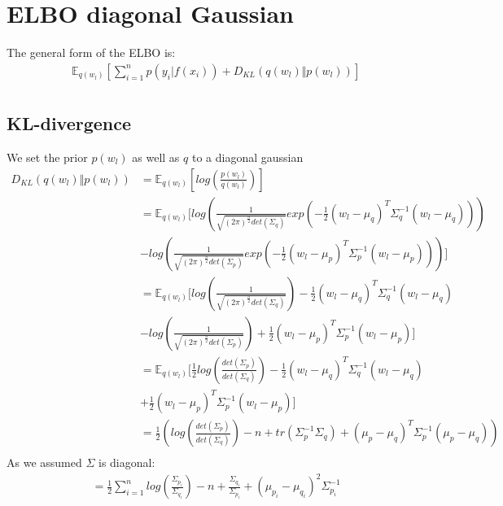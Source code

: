 \documentclass[a4paper]{scrartcl}
\begin{document}
\section{ELBO diagonal Gaussian}
    The general form of the ELBO is:
    \begin{align*}
        & \mathbb{E}_{q(w_l)}[\sum_{i=1}^n p(y_i \vert f(x_i)) + D_{KL}(q(w_l) \Vert p(w_l))]\\
    \end{align*}

\subsection{KL-divergence}
    We set the prior $p(w_l)$ as well as $q$ to a diagonal gaussian
    \begin{align*}
        D_{KL}(q(w_l) \Vert p(w_l))
        &= \mathbb{E}_{q(w_l)} [log(\frac{p(w_l)}{q(w_l)})] \\
        &= \mathbb{E}_{q(w_l)} [log(\frac{1}{\sqrt{(2 \pi)^{\frac{n}{2}} det(\Sigma_q)}} exp(-\frac{1}{2} (w_l - \mu_q)^T \Sigma^{-1}_q (w_l - \mu_q)))\\
        &- log(\frac{1}{\sqrt{(2 \pi)^{\frac{n}{2}} det(\Sigma_p)}} exp(-\frac{1}{2} (w_l - \mu_p)^T \Sigma^{-1}_p (w_l - \mu_p)))] \\
        &= \mathbb{E}_{q(w_l)} [log(\frac{1}{\sqrt{(2 \pi)^{\frac{n}{2}} det(\Sigma_q)}}) -\frac{1}{2} (w_l - \mu_q)^T \Sigma^{-1}_q (w_l - \mu_q)\\
        &- log(\frac{1}{\sqrt{(2 \pi)^{\frac{n}{2}} det(\Sigma_p)}}) + \frac{1}{2} (w_l - \mu_p)^T \Sigma^{-1}_p (w_l - \mu_p)] \\
        &= \mathbb{E}_{q(w_l)} [\frac{1}{2}log(\frac{det(\Sigma_p)}{det(\Sigma_q)}) -\frac{1}{2} (w_l - \mu_q)^T \Sigma^{-1}_q (w_l - \mu_q)\\
        & + \frac{1}{2} (w_l - \mu_p)^T \Sigma^{-1}_p (w_l - \mu_p)] \\
        &= \frac{1}{2}(log(\frac{det(\Sigma_p)}{det(\Sigma_q)}) -n + tr(\Sigma^{-1}_p \Sigma_q ) + (\mu_p - \mu_q)^T \Sigma^{-1}_p (\mu_p - \mu_q))\\
    \end{align*}
    As we assumed $\Sigma$ is diagonal:
    \begin{align}
        &= \frac{1}{2} \sum_{i=1}^n log(\frac{ \Sigma_{p_i}}{\Sigma_{q_i}}) - n + \frac{\Sigma_{q_i}}{\Sigma_{p_i}}  +  (\mu_{p_i} - \mu_{q_i})^2 \Sigma^{-1}_{p_i}
    \end{align}
\end{document}

